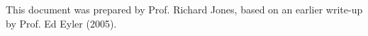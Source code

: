 \documentclass{revtex4}
\begin{document}
\begin{acknowledgments}
This document was prepared by Prof. Richard Jones, based on an earlier
write-up by Prof. Ed Eyler (2005).
\end{acknowledgments}

%

%
%
%
%
%
\end{document}
